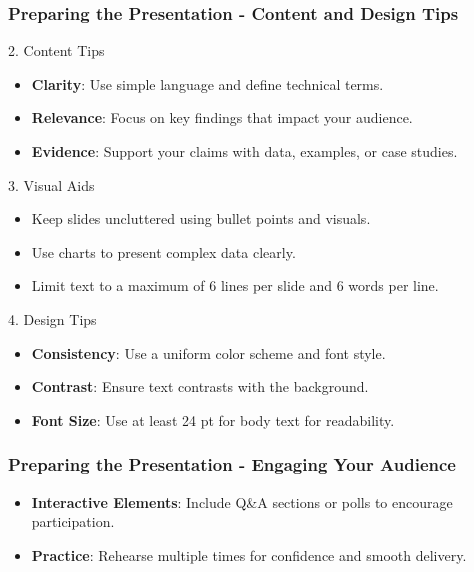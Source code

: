 \documentclass{beamer}
\begin{document}
\begin{frame}[fragile]
    \frametitle{Preparing the Presentation - Content and Design Tips}
    \begin{block}{2. Content Tips}
        \begin{itemize}
            \item \textbf{Clarity}: Use simple language and define technical terms.
            \item \textbf{Relevance}: Focus on key findings that impact your audience.
            \item \textbf{Evidence}: Support your claims with data, examples, or case studies.
        \end{itemize}
    \end{block}
    
    \begin{block}{3. Visual Aids}
        \begin{itemize}
            \item Keep slides uncluttered using bullet points and visuals.
            \item Use charts to present complex data clearly.
            \item Limit text to a maximum of 6 lines per slide and 6 words per line.
        \end{itemize}
    \end{block}
    
    \begin{block}{4. Design Tips}
        \begin{itemize}
            \item \textbf{Consistency}: Use a uniform color scheme and font style.
            \item \textbf{Contrast}: Ensure text contrasts with the background.
            \item \textbf{Font Size}: Use at least 24 pt for body text for readability.
        \end{itemize}
    \end{block}
\end{frame}

\begin{frame}[fragile]
    \frametitle{Preparing the Presentation - Engaging Your Audience}
    \begin{itemize}
        \item \textbf{Interactive Elements}: Include Q&A sections or polls to encourage participation.
        \item \textbf{Practice}: Rehearse multiple times for confidence and smooth delivery.
    \end{itemize}
\end{frame}
\end{document}

